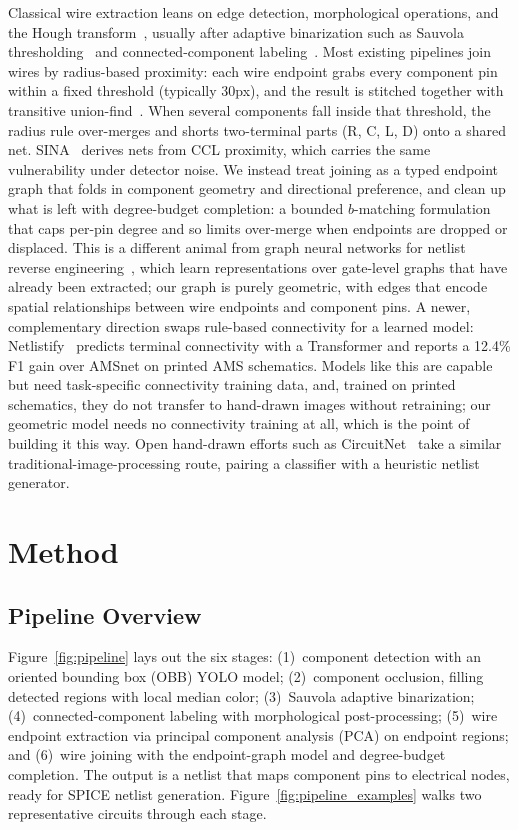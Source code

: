 \documentclass[journal]{IEEEtran}
\begin{document}
Classical wire extraction leans on edge detection, morphological operations, and the Hough transform~\cite{duda1972hough}, usually after adaptive binarization such as Sauvola thresholding~\cite{sauvola2000} and connected-component labeling~\cite{he2017ccl}. Most existing pipelines join wires by radius-based proximity: each wire endpoint grabs every component pin within a fixed threshold (typically 30px), and the result is stitched together with transitive union-find~\cite{tarjan1975union}. When several components fall inside that threshold, the radius rule over-merges and shorts two-terminal parts (R, C, L, D) onto a shared net. SINA~\cite{sina2026} derives nets from CCL proximity, which carries the same vulnerability under detector noise. We instead treat joining as a typed endpoint graph that folds in component geometry and directional preference, and clean up what is left with degree-budget completion: a bounded $b$-matching formulation~\cite{kuhn1955,schrijver2003combinatorial} that caps per-pin degree and so limits over-merge when endpoints are dropped or displaced. This is a different animal from graph neural networks for netlist reverse engineering~\cite{alrahis2021gnn}, which learn representations over gate-level graphs that have already been extracted; our graph is purely geometric, with edges that encode spatial relationships between wire endpoints and component pins. A newer, complementary direction swaps rule-based connectivity for a learned model: Netlistify~\cite{netlistify2025} predicts terminal connectivity with a Transformer and reports a 12.4\% F1 gain over AMSnet on printed AMS schematics. Models like this are capable but need task-specific connectivity training data, and, trained on printed schematics, they do not transfer to hand-drawn images without retraining; our geometric model needs no connectivity training at all, which is the point of building it this way. Open hand-drawn efforts such as CircuitNet~\cite{circuitnet} take a similar traditional-image-processing route, pairing a classifier with a heuristic netlist generator.

\section{Method}

\subsection{Pipeline Overview}

Figure~\ref{fig:pipeline} lays out the six stages: (1)~component detection with an oriented bounding box (OBB) YOLO model; (2)~component occlusion, filling detected regions with local median color; (3)~Sauvola adaptive binarization; (4)~connected-component labeling with morphological post-processing; (5)~wire endpoint extraction via principal component analysis (PCA) on endpoint regions; and (6)~wire joining with the endpoint-graph model and degree-budget completion. The output is a netlist that maps component pins to electrical nodes, ready for SPICE netlist generation. Figure~\ref{fig:pipeline_examples} walks two representative circuits through each stage.
\end{document}
